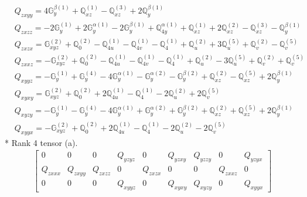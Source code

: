 \documentclass[fleqn,8pt,landscape]{jsarticle}
\begin{document}
\begin{align*}
& Q_{zxyy} = 4 \mathbb{G}_{y}^{\beta(1)} + \mathbb{Q}_{xz}^{(1)} - \mathbb{Q}_{xz}^{(3)} + 2 \mathbb{Q}_{y}^{\beta(1)} \\
& Q_{zxzz} = - 2 \mathbb{G}_{y}^{(1)} + 2 \mathbb{G}_{y}^{\alpha(1)} - 2 \mathbb{G}_{y}^{\beta(1)} + \mathbb{Q}_{4y}^{\alpha(1)} + \mathbb{Q}_{xz}^{(1)} + 2 \mathbb{Q}_{xz}^{(2)} - \mathbb{Q}_{xz}^{(3)} - \mathbb{Q}_{y}^{\beta(1)} \\
& Q_{zxzx} = \mathbb{G}_{xyz}^{(2)} + \mathbb{Q}_{0}^{(2)} - \mathbb{Q}_{4u}^{(1)} - \mathbb{Q}_{4v}^{(1)} - \mathbb{Q}_{4}^{(1)} + \mathbb{Q}_{u}^{(2)} + 3 \mathbb{Q}_{u}^{(5)} + \mathbb{Q}_{v}^{(2)} - \mathbb{Q}_{v}^{(5)} \\
& Q_{zxxz} = - \mathbb{G}_{xyz}^{(2)} + \mathbb{Q}_{0}^{(2)} - \mathbb{Q}_{4u}^{(1)} - \mathbb{Q}_{4v}^{(1)} - \mathbb{Q}_{4}^{(1)} + \mathbb{Q}_{u}^{(2)} - 3 \mathbb{Q}_{u}^{(5)} + \mathbb{Q}_{v}^{(2)} + \mathbb{Q}_{v}^{(5)} \\
& Q_{xyyz} = - \mathbb{G}_{y}^{(1)} + \mathbb{G}_{y}^{(4)} - 4 \mathbb{G}_{y}^{\alpha(1)} - \mathbb{G}_{y}^{\alpha(2)} - \mathbb{G}_{y}^{\beta(2)} + \mathbb{Q}_{xz}^{(2)} - \mathbb{Q}_{xz}^{(5)} + 2 \mathbb{Q}_{y}^{\beta(1)} \\
& Q_{xyxy} = \mathbb{G}_{xyz}^{(2)} + \mathbb{Q}_{0}^{(2)} + 2 \mathbb{Q}_{4u}^{(1)} - \mathbb{Q}_{4}^{(1)} - 2 \mathbb{Q}_{u}^{(2)} + 2 \mathbb{Q}_{v}^{(5)} \\
& Q_{xyzy} = - \mathbb{G}_{y}^{(1)} - \mathbb{G}_{y}^{(4)} - 4 \mathbb{G}_{y}^{\alpha(1)} + \mathbb{G}_{y}^{\alpha(2)} + \mathbb{G}_{y}^{\beta(2)} + \mathbb{Q}_{xz}^{(2)} + \mathbb{Q}_{xz}^{(5)} + 2 \mathbb{Q}_{y}^{\beta(1)} \\
& Q_{xyyx} = - \mathbb{G}_{xyz}^{(2)} + \mathbb{Q}_{0}^{(2)} + 2 \mathbb{Q}_{4u}^{(1)} - \mathbb{Q}_{4}^{(1)} - 2 \mathbb{Q}_{u}^{(2)} - 2 \mathbb{Q}_{v}^{(5)}
\end{align*}
* Rank 4 tensor (a).
\begin{align*}
\begin{bmatrix} 0 & 0 & 0 & Q_{yzyz} & 0 & Q_{yzxy} & Q_{yzzy} & 0 & Q_{yzyx} \\ Q_{zxxx} & Q_{zxyy} & Q_{zxzz} & 0 & Q_{zxzx} & 0 & 0 & Q_{zxxz} & 0 \\ 0 & 0 & 0 & Q_{xyyz} & 0 & Q_{xyxy} & Q_{xyzy} & 0 & Q_{xyyx} \end{bmatrix}
\end{align*}
\end{document}
